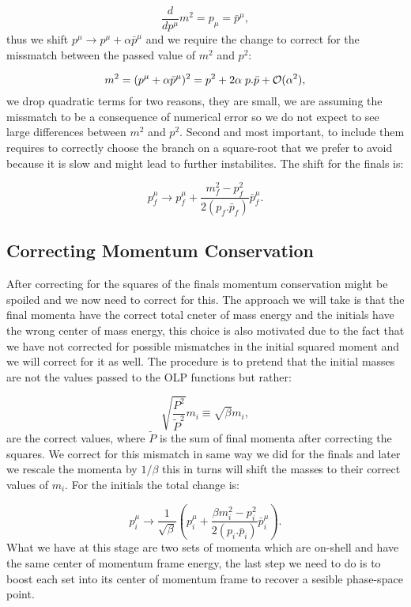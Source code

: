 \documentclass[a4paper]{article}
\begin{document}
\begin{equation}
 \frac{d}{dp^\mu}m^2 = p_\mu = \bar p^\mu,
\end{equation}
thus we shift $p^\mu\rightarrow p^\mu+\alpha\bar p^\mu$ and 
we require the change to correct for the missmatch between the passed value of $m^2$ and $p^2$:

\begin{equation}
 m^2 = (p^\mu+\alpha\bar p^\mu )^2 = p^2 + 2\alpha\hskip 0.1cm p.\bar p+\mathcal{O}(\alpha^2),
\end{equation}
we drop quadratic terms for two reasons, they are small, we are assuming the missmatch to be a consequence 
of numerical error so we do not expect to see large differences between $m^2$ and $p^2$. Second and most 
important, to include them requires to correctly choose the branch on a square-root that we prefer to avoid 
because it is slow and might lead to further instabilites. The shift for the finals is:

\begin{equation}
p_f^\mu\rightarrow p_f^\mu+\frac{m_f^2-p_f^2}{2(p_f.\bar p_f)}\bar p_f^\mu.
\end{equation}

\subsection{Correcting Momentum Conservation}
After correcting for the squares of the finals momentum conservation might be spoiled and we now 
need to correct for this. The approach we will take is that the final momenta have the correct 
total cneter of mass energy and the initials have the wrong center of mass energy, this choice is 
also motivated due to the fact that we have not corrected for possible mismatches in the initial squared
moment and we will correct for it as well. The procedure is to pretend that the initial masses are not the 
values passed to the OLP functions but rather:

\begin{equation}
 \sqrt{\frac{P^2}{\tilde P^2}}m_i\equiv \sqrt{\beta}m_i,
\end{equation}
are the correct values, where $\tilde P$ is the sum of final momenta after correcting the squares.
We correct for this mismatch in same way we did for the finals and later we rescale 
the momenta by $1/\beta$ this in turns will shift the masses to their correct values of $m_i$.
For the initials the total change is:

\begin{equation}
 p_i^\mu \rightarrow \frac{1}{\sqrt\beta}
 \left(
 p_i^\mu 
 + 
 \frac{\beta m_i^2-p_i^2}{2(p_i.\bar p_i)}\bar p_i^\mu
 \right).
\end{equation}
What we have at this stage are two sets of momenta which are on-shell and have the same 
center of momentum frame energy, the last step we need to do is to boost each set into 
its center of momentum frame to recover a sesible phase-space point.
\end{document}
